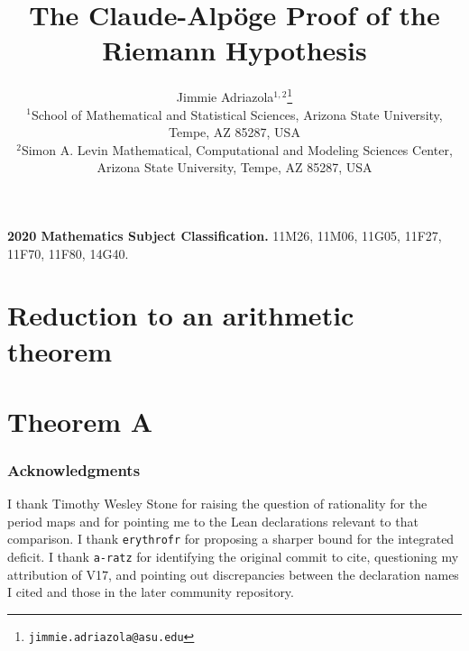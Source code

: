 \documentclass[11pt,letterpaper]{article}
\title{\bfseries The Claude-Alp\"oge Proof of the Riemann Hypothesis}
\author{Jimmie Adriazola$^{1,2}$\thanks{\texttt{jimmie.adriazola@asu.edu}}\\[6pt]
\small $^1$School of Mathematical and Statistical Sciences, Arizona State University,\\[-2pt]
\small Tempe, AZ 85287, USA\\[3pt]
\small $^2$Simon A. Levin Mathematical, Computational and Modeling Sciences Center,\\[-2pt]
\small Arizona State University, Tempe, AZ 85287, USA}
\date{}
\theoremstyle{plain}
\theoremstyle{definition}
\theoremstyle{remark}
\numberwithin{equation}{section}
\begin{document}
\maketitle



\noindent\textbf{2020 Mathematics Subject Classification.} 11M26, 11M06, 11G05, 11F27, 11F70, 11F80, 14G40.

\tableofcontents



\part{Reduction to an arithmetic theorem}






\part{Theorem A}













\section*{Acknowledgments}
I thank Timothy Wesley Stone for raising the question of rationality for the period maps and for pointing me to the Lean declarations relevant to that comparison.
I thank \texttt{erythrofr} for proposing a sharper bound for the integrated deficit.
I thank \texttt{a-ratz} for identifying the original commit to cite, questioning my attribution of V17, and pointing out discrepancies between the declaration names I cited and those in the later community repository.



\end{document}
